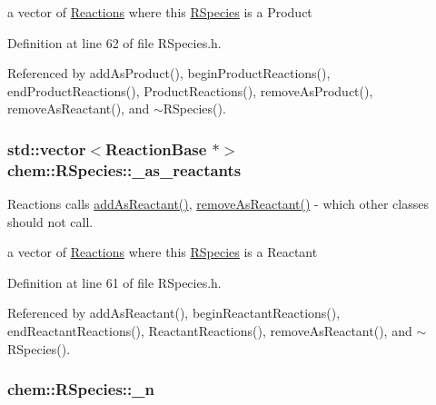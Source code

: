a vector of \hyperlink{classchem_1_1Reaction}{Reactions} where this \hyperlink{classchem_1_1RSpecies}{R\-Species} is a Product 



Definition at line 62 of file R\-Species.\-h.



Referenced by add\-As\-Product(), begin\-Product\-Reactions(), end\-Product\-Reactions(), Product\-Reactions(), remove\-As\-Product(), remove\-As\-Reactant(), and $\sim$\-R\-Species().

\hypertarget{classchem_1_1RSpecies_a7ffda464bbe610c372cac83e6e735023}{
\subsubsection[{\-\_\-as\-\_\-reactants}]{\setlength{\rightskip}{0pt plus 5cm}std\-::vector$<${\bf Reaction\-Base} $\ast$$>$ {\bf chem\-::\-R\-Species\-::\-\_\-as\-\_\-reactants}}}\label{classchem_1_1RSpecies_a7ffda464bbe610c372cac83e6e735023}


Reactions calls \hyperlink{classchem_1_1RSpecies_a2f69141d801e4660ab411953fef74ea2}{add\-As\-Reactant()}, \hyperlink{classchem_1_1RSpecies_ab8f32e15791cfddea7cf4cac5a39c0fa}{remove\-As\-Reactant()} -\/ which other classes should not call. 

a vector of \hyperlink{classchem_1_1Reaction}{Reactions} where this \hyperlink{classchem_1_1RSpecies}{R\-Species} is a Reactant 

Definition at line 61 of file R\-Species.\-h.



Referenced by add\-As\-Reactant(), begin\-Reactant\-Reactions(), end\-Reactant\-Reactions(), Reactant\-Reactions(), remove\-As\-Reactant(), and $\sim$\-R\-Species().

\hypertarget{classchem_1_1RSpecies_a60e53ebfe464923452c54322dfd479dc}{
\subsubsection[{\-\_\-n}]{ {\bf chem\-::\-R\-Species\-::\-\_\-n}}}\label{classchem_1_1RSpecies_a60e53ebfe464923452c54322dfd479dc}


